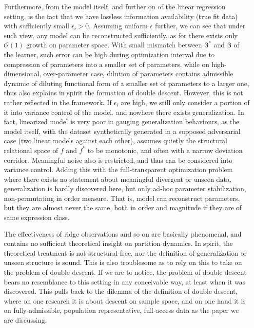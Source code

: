 Furthermore, from the model itself, and further on of the linear regression setting, is the fact that we have lossless information availability (true fit data) with sufficiently small $\epsilon_{i}>0$. Assuming uniform $\epsilon$ further, we can see that under such view, any model can be reconstructed sufficiently, as for there exists only $\mathcal{O}(1)$ growth on parameter space. With small mismatch between $\bm{\beta}^{*}$ and $\bm{\beta}$ of the learner, such error can be high during optimization interval due to compression of parameters into a smaller set of parameters, while on high-dimensional, over-parameter case, dilution of parameters contains admissible dynamic of diluting functional form of a smaller set of parameters to a larger one, thus also explains in spirit the formation of double descent. However, this is not rather reflected in the framework. If $\epsilon_{i}$ are high, we still only consider a portion of it into variance control of the model, and nowhere there exists generalization. In fact, linearized model is very poor in gauging generalization behaviours, as the model itself, with the dataset synthetically generated in a supposed adversarial case (two linear models against each other), assumes quietly the structural relational space of $f$ and $f^{*}$ to be monotonic, and often with a narrow deviation corridor. Meaningful noise also is restricted, and thus can be considered into variance control. Adding this with the full-transparent optimization problem where there exists no statement about meaningful divergent or unseen data, generalization is hardly discovered here, but only ad-hoc parameter stabilization, non-permutating in order measure. That is, model can reconstruct parameters, but they are almost never the same, both in order and magnitude if they are of same expression class. 

The effectiveness of ridge observations and so on are basically phenomenal, and contains no sufficient theoretical insight on partition dynamics. In spirit, the theoretical treatment is not structural-free, nor the definition of generalization or unseen structure is sound. This is also troublesome as to rely on this to take on the problem of double descent. If we are to notice, the problem of double descent bears no resemblance to this setting in any conceivable way, at least when it was discovered. This pulls back to the dilemma of the definition of double descent, where on one research it is about descent on sample space, and on one hand it is on fully-admissible, population representative, full-access data as the paper we are discussing. 



